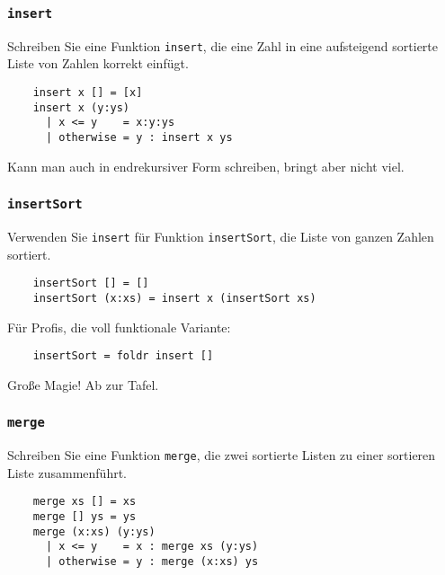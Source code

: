 \documentclass{beamer}
\begin{document}
\begin{frame}[fragile]
  \frametitle{\lstinline{insert}}
  Schreiben Sie eine Funktion \lstinline{insert}, die eine Zahl in eine aufsteigend sortierte Liste von Zahlen korrekt einfügt.
  \pause
  \begin{lstlisting}
    insert x [] = [x]
    insert x (y:ys)
      | x <= y    = x:y:ys
      | otherwise = y : insert x ys
  \end{lstlisting}
  Kann man auch in endrekursiver Form schreiben, bringt aber nicht viel.
\end{frame}

\begin{frame}[fragile]
  \frametitle{\lstinline{insertSort}}
  Verwenden Sie \lstinline{insert} für Funktion \lstinline{insertSort}, die Liste von ganzen Zahlen sortiert.
  \pause
  \begin{lstlisting}
    insertSort [] = []
    insertSort (x:xs) = insert x (insertSort xs)
  \end{lstlisting}
  \pause
  Für Profis, die voll funktionale Variante:
  \pause
  \begin{lstlisting}
    insertSort = foldr insert []
  \end{lstlisting}
  Große Magie! Ab zur Tafel.
\end{frame}

\begin{frame}[fragile]
  \frametitle{\lstinline{merge}}
  Schreiben Sie eine Funktion \lstinline{merge}, die zwei sortierte Listen zu einer sortieren Liste zusammenführt.
  \pause
  \begin{lstlisting}
    merge xs [] = xs
    merge [] ys = ys
    merge (x:xs) (y:ys)
      | x <= y    = x : merge xs (y:ys)
      | otherwise = y : merge (x:xs) ys
  \end{lstlisting}
\end{frame}
\end{document}
